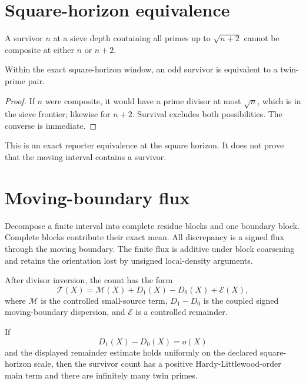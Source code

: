\documentclass[11pt,a4paper]{article}
\begin{document}
\section{Square-horizon equivalence}
A survivor $n$ at a sieve depth containing all primes up to $\sqrt{n+2}$ cannot be composite at either $n$ or $n+2$.
\begin{proposition}
Within the exact square-horizon window, an odd survivor is equivalent to a twin-prime pair.
\end{proposition}
\begin{proof}
If $n$ were composite, it would have a prime divisor at most $\sqrt n$, which is in the sieve frontier; likewise for $n+2$. Survival excludes both possibilities. The converse is immediate.
\end{proof}
This is an exact reporter equivalence at the square horizon. It does not prove that the moving interval contains a survivor.

\section{Moving-boundary flux}
Decompose a finite interval into complete residue blocks and one boundary block. Complete blocks contribute their exact mean. All discrepancy is a signed flux through the moving boundary. The finite flux is additive under block coarsening and retains the orientation lost by unsigned local-density arguments.

After divisor inversion, the count has the form
\begin{equation}
\mathcal T(X)=\mathcal M(X)+D_1(X)-D_0(X)+\mathcal E(X),
\end{equation}
where $\mathcal M$ is the controlled small-source term, $D_1-D_0$ is the coupled signed moving-boundary dispersion, and $\mathcal E$ is a controlled remainder.

\begin{theorem}
If
\begin{equation}
D_1(X)-D_0(X)=o(X)
\end{equation}
and the displayed remainder estimate holds uniformly on the declared square-horizon scale, then the survivor count has a positive Hardy-Littlewood-order main term and there are infinitely many twin primes.
\end{theorem}
\end{document}
